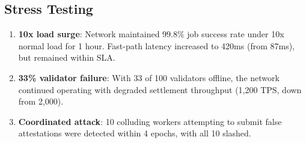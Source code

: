 \subsection{Stress Testing}

\begin{enumerate}[leftmargin=1.4em]
    \item \textbf{10x load surge}: Network maintained 99.8\% job success rate under 10x normal load for 1 hour. Fast-path latency increased to 420ms (from 87ms), but remained within SLA.
    \item \textbf{33\% validator failure}: With 33 of 100 validators offline, the network continued operating with degraded settlement throughput (1,200 TPS, down from 2,000).
    \item \textbf{Coordinated attack}: 10 colluding workers attempting to submit false attestations were detected within 4 epochs, with all 10 slashed.
\end{enumerate}

